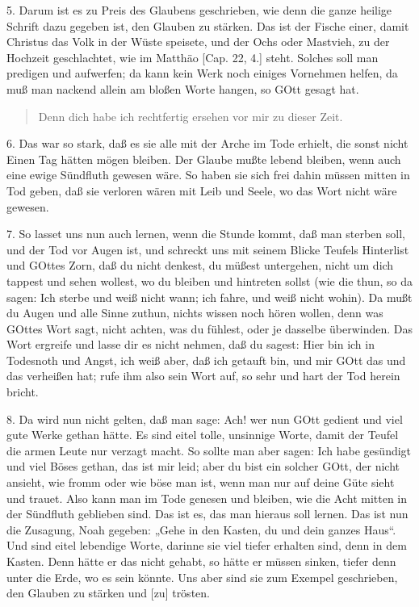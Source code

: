 5. Darum ist es zu Preis des Glaubens geschrieben, wie denn die ganze heilige Schrift dazu gegeben ist, den Glauben zu stärken. Das ist der Fische einer, damit Christus das Volk in der Wüste speisete, und der Ochs oder Mastvieh, zu der Hochzeit geschlachtet, wie im Matthäo [Cap. 22, 4.] steht. Solches soll man predigen und aufwerfen; da kann kein Werk noch einiges Vornehmen helfen, da muß man nackend allein am bloßen Worte hangen, so GOtt gesagt hat.

\begin{quote}
Denn dich habe ich rechtfertig ersehen vor mir zu dieser Zeit.
\end{quote}

6. Das war so stark, daß es sie alle mit der Arche im Tode erhielt, die sonst nicht Einen Tag hätten mögen bleiben. Der Glaube mußte lebend bleiben, wenn auch eine ewige Sündfluth gewesen wäre. So haben sie sich frei dahin müssen mitten in Tod geben, daß sie verloren wären mit Leib und Seele, wo das Wort nicht wäre gewesen.

7. So lasset uns nun auch lernen, wenn die Stunde kommt, daß man sterben soll, und der Tod vor Augen ist, und schreckt uns mit seinem Blicke Teufels Hinterlist und GOttes Zorn, daß du nicht denkest, du müßest untergehen, nicht um dich tappest und sehen wollest, wo du bleiben und hintreten sollst (wie die thun, so da sagen: Ich sterbe und weiß nicht wann; ich fahre, und weiß
nicht wohin). Da mußt du Augen und alle Sinne zuthun, nichts wissen noch hören wollen, denn was GOttes Wort sagt, nicht achten, was du fühlest, oder je dasselbe überwinden. Das Wort ergreife und lasse dir es nicht nehmen, daß du sagest: Hier bin ich in Todesnoth und Angst, ich weiß aber, daß ich getauft bin, und mir GOtt das und das verheißen hat; rufe ihm also sein Wort auf, so sehr und hart der Tod herein bricht.

8. Da wird nun nicht gelten, daß man sage: Ach! wer nun GOtt gedient und viel gute Werke gethan hätte. Es sind eitel tolle, unsinnige Worte, damit der Teufel die armen Leute nur verzagt macht. So sollte man aber sagen: Ich habe gesündigt und viel Böses gethan, das ist mir leid; aber du bist ein solcher GOtt, der nicht ansieht, wie fromm oder wie böse man ist, wenn man nur auf deine Güte sieht und trauet. Also kann man im Tode genesen und bleiben, wie die Acht mitten in der Sündfluth geblieben sind. Das ist es, das man hieraus soll lernen. Das ist nun die Zusagung, Noah gegeben: „Gehe in den Kasten, du und dein ganzes Haus“. Und sind eitel lebendige Worte, darinne sie viel tiefer erhalten sind, denn in dem Kasten. Denn hätte er das nicht gehabt, so hätte er müssen sinken, tiefer denn unter die Erde, wo es sein könnte. Uns aber sind sie zum Exempel geschrieben, den Glauben zu stärken und [zu] trösten.

